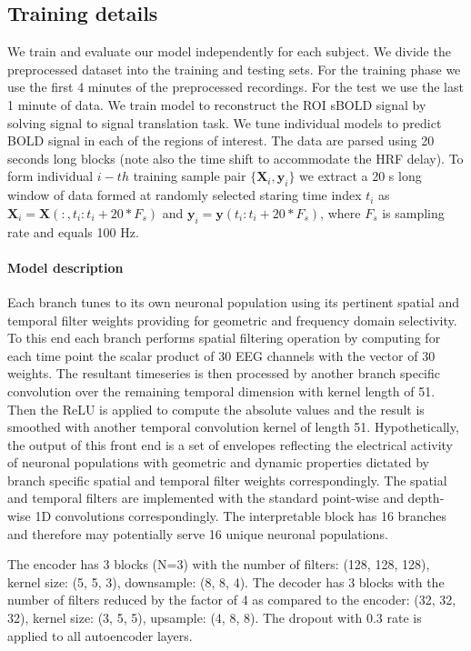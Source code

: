 \documentclass{article}
\begin{document}
\subsection{Training details}
\label{section:details}
We train and evaluate our model independently for each subject. We divide the preprocessed dataset into the training and testing sets. For the training phase we use the first 4 minutes of the preprocessed recordings. For the test we use the last 1 minute of data. We train model to reconstruct the ROI sBOLD signal by solving signal to signal translation task. We tune individual models to predict BOLD signal in each of the regions of interest. The data are parsed using 20 seconds long blocks (note also the time shift to accommodate the HRF delay). To form individual $i-th$ training sample pair $\{\mathbf{X}_i,\mathbf{y}_i\}$ we extract a 20 s long window of data formed at randomly selected staring time index $t_i$ as $\mathbf{X}_i = \mathbf{X}(:,t_i:t_i+20 *F_s)$ and $\mathbf{y}_i = \mathbf{y}(t_i:t_i+20 *F_s)$, where $F_s$ is sampling rate and equals 100 Hz.

\paragraph{Model description }

Each branch tunes to its own neuronal population using its pertinent spatial and temporal filter weights providing for geometric and frequency domain selectivity. To this end each branch performs spatial filtering operation by computing for each time point the scalar product of 30 EEG channels with the vector of 30 weights. The resultant timeseries is then processed by another branch specific convolution over the remaining temporal dimension with kernel length of 51. Then the ReLU is applied to compute the absolute values and the result is smoothed with another temporal convolution kernel of length 51. Hypothetically, the output of this front end is a set of envelopes reflecting the electrical activity of neuronal populations with geometric and dynamic properties dictated by branch specific spatial and temporal filter weights correspondingly. The spatial and temporal filters are implemented with the standard point-wise and depth-wise 1D convolutions correspondingly. The interpretable block has 16 branches and therefore may potentially serve 16 unique neuronal populations.

The encoder has 3 blocks (N=3) with the number of filters: (128, 128, 128), kernel size: (5, 5, 3), downsample: (8, 8, 4). The decoder has 3 blocks with the number of filters reduced by the factor of 4  as compared to the encoder: (32, 32, 32), kernel size: (3, 5, 5), upsample: (4, 8, 8). The dropout with 0.3 rate is applied to all autoencoder layers.
\end{document}
